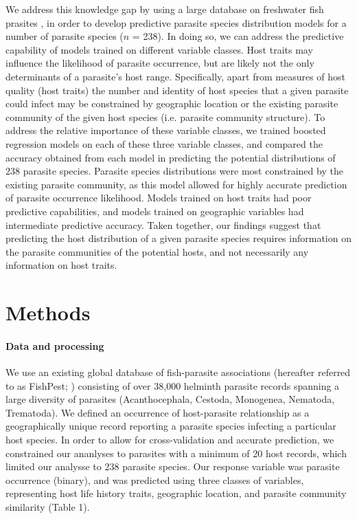 \documentclass[12pt]{article}
\begin{document}
   
 We address this knowledge gap by using a large database on freshwater fish prasites \citep{strona2013}, in order to develop predictive parasite species distribution models for a number of parasite species ($n$ = 238). In doing so, we can address the predictive capability of models trained on different variable classes. Host traits may influence the likelihood of parasite occurrence, but are likely not the only determinants of a parasite's host range. Specifically, apart from measures of host quality (host traits) the number and identity of host species that a given parasite could infect may be constrained by geographic location or the existing parasite community of the given host species (i.e. parasite community structure). To address the relative importance of these variable classes, we trained boosted regression models on each of these three variable classes, and compared the accuracy obtained from each model in predicting the potential distributions of 238 parasite species. Parasite species distributions were most constrained by the existing parasite community, as this model allowed for highly accurate prediction of parasite occurrence likelihood. Models trained on host traits had poor predictive capabilities, and models trained on geographic variables had intermediate predictive accuracy. Taken together, our findings suggest that predicting the host distribution of a given parasite species requires information on the parasite communities of the potential hosts, and not necessarily any information on host traits. 
  
 

\section*{Methods}
 \paragraph{Data and processing}
  We use an existing global database of fish-parasite associations (hereafter referred to as FishPest; \citep{strona2013}) consisting of over 38,000 helminth parasite records spanning a large diversity of parasites (Acanthocephala, Cestoda, Monogenea, Nematoda, Trematoda). We defined an occurrence of host-parasite relationship as a geographically unique record reporting a parasite species infecting a particular host species. In order to allow for cross-validation and accurate prediction, we constrained our ananlyses to parasites with a minimum of 20 host records, which limited our analysse to 238 parasite species. Our response variable was parasite occurrence (binary), and was predicted using three classes of variables, representing host life history traits, geographic location, and parasite community similarity (Table 1). \\
  
\end{document}

